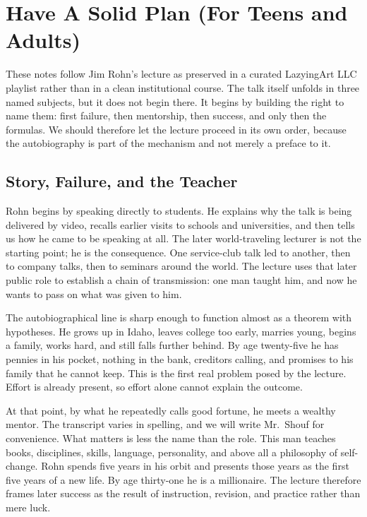 \chapter{Have A Solid Plan (For Teens and Adults)}

These notes follow Jim Rohn's lecture as preserved in a curated LazyingArt LLC playlist rather than in a clean institutional course. The talk itself unfolds in three named subjects, but it does not begin there. It begins by building the right to name them: first failure, then mentorship, then success, and only then the formulas. We should therefore let the lecture proceed in its own order, because the autobiography is part of the mechanism and not merely a preface to it.

\section{Story, Failure, and the Teacher}

Rohn begins by speaking directly to students. He explains why the talk is being delivered by video, recalls earlier visits to schools and universities, and then tells us how he came to be speaking at all. The later world-traveling lecturer is not the starting point; he is the consequence. One service-club talk led to another, then to company talks, then to seminars around the world. The lecture uses that later public role to establish a chain of transmission: one man taught him, and now he wants to pass on what was given to him.

The autobiographical line is sharp enough to function almost as a theorem with hypotheses. He grows up in Idaho, leaves college too early, marries young, begins a family, works hard, and still falls further behind. By age twenty-five he has pennies in his pocket, nothing in the bank, creditors calling, and promises to his family that he cannot keep. This is the first real problem posed by the lecture. Effort is already present, so effort alone cannot explain the outcome.

At that point, by what he repeatedly calls good fortune, he meets a wealthy mentor. The transcript varies in spelling, and we will write Mr.~Shouf for convenience. What matters is less the name than the role. This man teaches books, disciplines, skills, language, personality, and above all a philosophy of self-change. Rohn spends five years in his orbit and presents those years as the first five years of a new life. By age thirty-one he is a millionaire. The lecture therefore frames later success as the result of instruction, revision, and practice rather than mere luck.

